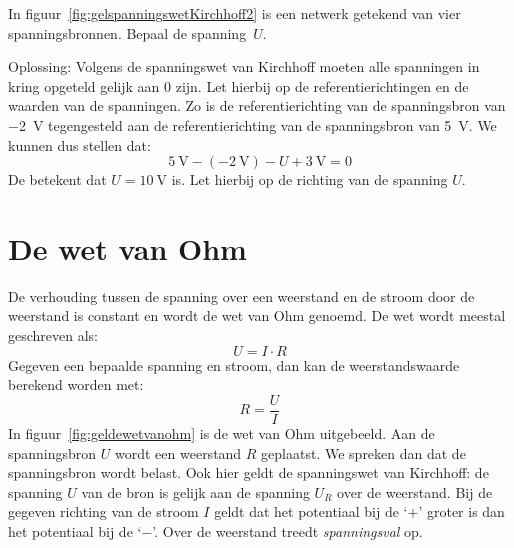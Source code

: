 \begin{example}
In figuur~\ref{fig:gelspanningswetKirchhoff2} is een netwerk getekend van vier spanningsbronnen.
Bepaal de spanning~$U$.
\begin{center}
\centering
{}
\label{fig:gelspanningswetKirchhoff2}
\end{center}
Oplossing: Volgens de spanningswet van Kirchhoff moeten alle spanningen in kring opgeteld gelijk aan 0 zijn.
Let hierbij op de referentierichtingen en de waarden van de spanningen. Zo is de referentierichting van
de spanningsbron van \SI{-2}{\volt} tegengesteld aan de referentierichting van de spanningsbron van
\SI{5}{\volt}. We kunnen dus stellen dat:
\begin{equation}
\SI{5}{\volt} - (\SI{-2}{\volt}) - U + \SI{3}{\volt} = 0
\end{equation}
De betekent dat $U = \SI{10}{\volt}$ is. Let hierbij op de richting van de spanning $U$.
\end{example}


\section{De wet van Ohm}
De verhouding tussen de spanning over een weerstand en de stroom door de weerstand is constant
en wordt de wet van Ohm genoemd. De wet wordt meestal geschreven als:
\begin{equation}
U=I\cdot R
\end{equation}
%
Gegeven een bepaalde spanning en stroom, dan kan de weerstandswaarde berekend worden met:
%
\begin{equation}
R = \dfrac{U}{I}
\end{equation}
%
In figuur~\ref{fig:geldewetvanohm} is de wet van Ohm uitgebeeld. Aan de spanningsbron $U$ wordt
een weerstand $R$ geplaatst. We spreken dan dat de spanningsbron wordt belast. Ook hier geldt de
spanningswet van Kirchhoff: de spanning $U$ van de bron is gelijk aan de spanning $U_R$ over de
weerstand. Bij de gegeven richting van de stroom $I$ geldt dat het potentiaal bij de `$+$' groter
is dan het potentiaal bij de `$-$'. Over de weerstand treedt \textsl{spanningsval} op.

